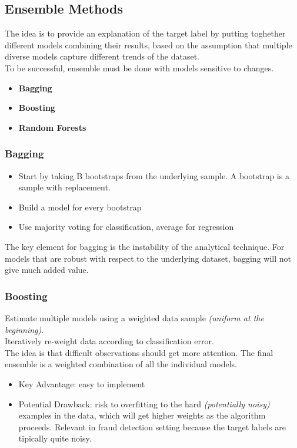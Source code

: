     \subsection{Ensemble Methods}
        The idea is to provide an explanation of the target label by putting toghether different models combining their results, based on the assumption that multiple diverse models capture different trends of the dataset.\\
        To be successful, ensemble must be done with models sensitive to changes.
        \begin{itemize}
            \item \textbf{Bagging}
            \item \textbf{Boosting}
            \item \textbf{Random Forests}
        \end{itemize}
        \subsubsection{Bagging}
            \begin{itemize}
                \item Start by taking B bootstraps from the underlying sample. A bootstrap is a sample with replacement.
                \item Build a model for every bootstrap
                \item Use majority voting for classification, average for regression
            \end{itemize}
            The key element for bagging is the instability of the analytical technique. For models that are robust with respect to the underlying dataset, bagging will not give much added value.
        \subsubsection{Boosting}
            Estimate multiple models using a weighted data sample \textit{(uniform at the beginning)}.\\
            Iteratively re-weight data according to classification error.\\
            The idea is that difficult observations should get more attention. The final ensemble is a weighted combination of all the individual models.
            \begin{itemize}
                \item Key Advantage: easy to implement
                \item Potential Drawback: risk to overfitting to the hard \textit{(potentially noisy)} examples in the data, which will get higher weights as the algorithm proceeds. Relevant in fraud detection setting because the target labels are tipically quite noisy.
            \end{itemize}
